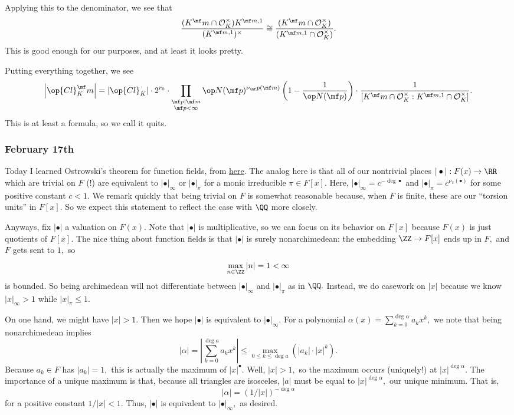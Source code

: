 Applying this to the denominator, we see that
\[\frac{(K^\mf m\cap\mathcal O_K^\times)K^{\mf m,1}}{(K^{\mf m,1})^\times}\cong\frac{(K^\mf m\cap\mathcal O_K^\times)}{(K^{\mf m,1}\cap\mathcal O_K^\times)}.\]
This is good enough for our purposes, and at least it looks pretty.

Putting everything together, we see
\[\left|\op{Cl}_K^\mf m\right|=\left|\op{Cl}_K\right|\cdot2^{r_0}\cdot\prod_{\substack{\mf p\mid\mf m\\\mf p<\infty}}\op N(\mf p)^{\nu_\mf p(\mf m)}\left(1-\frac1{\op N(\mf p)}\right)\cdot\frac1{[K^\mf m\cap\mathcal O_K^\times:K^{\mf m,1}\cap\mathcal O_K^\times]}.\]
This is at least a formula, so we call it quits.

\subsubsection{February 17th}
Today I learned Ostrowski's theorem for function fields, from \href{https://kconrad.math.uconn.edu/blurbs/gradnumthy/ostrowskiF(T).pdf}{here}. The analog here is that all of our nontrivial places $|\bullet|:F(x)\to\RR$ which are trivial on $F$ (!) are equivalent to $|\bullet|_\infty$ or $|\bullet|_\pi$ for a monic irreducible $\pi\in F[x].$ Here, $|\bullet|_\infty=c^{-\deg\bullet}$ and $|\bullet|_\pi=c^{\nu_\pi(\bullet)}$ for some positive constant $c<1.$ We remark quickly that being trivial on $F$ is somewhat reasonable because, when $F$ is finite, these are our ``torsion units'' in $F[x].$ So we expect this statement to reflect the case with $\QQ$ more closely.

Anyways, fix $|\bullet|$ a valuation on $F(x).$ Note that $|\bullet|$ is multiplicative, so we can focus on its behavior on $F[x]$ because $F(x)$ is just quotients of $F[x].$ The nice thing about function fields is that $|\bullet|$ is surely nonarchimedean: the embedding $\ZZ\to F[x]$ ends up in $F,$ and $F$ gets sent to $1,$ so
\[\max_{n\in\ZZ}|n|=1<\infty\]
is bounded. So being archimedean will not differentiate between $|\bullet|_\infty$ and $|\bullet|_\pi$ as in $\QQ.$ Instead, we do casework on $|x|$ because we know $|x|_\infty>1$ while $|x|_\pi\le1.$

On one hand, we might have $|x|>1.$ Then we hope $|\bullet|$ is equivalent to $|\bullet|_\infty.$ For a polynomial $\alpha(x)=\sum_{k=0}^{\deg\alpha}a_kx^k,$ we note that being nonarchimedean implies
\[|\alpha|=\left|\sum_{k=0}^{\deg a}a_kx^k\right|\le\max_{0\le k\le\deg a}\left(|a_k|\cdot|x|^k\right).\]
Because $a_k\in F$ has $|a_k|=1,$ this is actually the maximum of $|x|^\bullet.$ Well, $|x|>1,$ so the maximum occurs (uniquely!) at $|x|^{\deg\alpha}.$ The importance of a unique maximum is that, because all triangles are isosceles, $|a|$ must be equal to $|x|^{\deg\alpha},$ our unique minimum. That is,
\[|\alpha|=(1/|x|)^{-\deg\alpha}\]
for a positive constant $1/|x|<1.$ Thus, $|\bullet|$ is equivalent to $|\bullet|_\infty,$ as desired.


